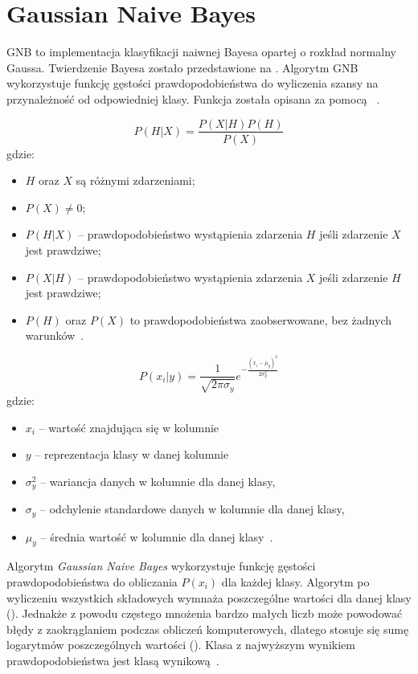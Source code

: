 \section{Gaussian Naive Bayes}
GNB to implementacja klasyfikacji naiwnej Bayesa opartej o rozkład normalny Gaussa.
Twierdzenie Bayesa zostało przedstawione na . Algorytm GNB wykorzystuje funkcję gęstości prawdopodobieństwa do wyliczenia szansy na przynależność od odpowiedniej klasy. Funkcja została opisana za pomocą ~\cite{Joyce2003}.

\begin{equation}\label{math:bayes}
P(H|X) = \frac{P(X|H) P(H)}{P(X)}
\end{equation}
gdzie:
\begin{itemize}
    \item $H$ oraz $X$ są różnymi zdarzeniami;
    \item $P(X) \neq 0$;
    \item $P(H|X)$ -- prawdopodobieństwo wystąpienia zdarzenia $H$ jeśli zdarzenie $X$ jest prawdziwe;
    \item $P(X|H)$ -- prawdopodobieństwo wystąpienia zdarzenia $X$ jeśli zdarzenie $H$ jest prawdziwe;
    \item $P(H)$ oraz $P(X)$ to prawdopodobieństwa zaobserwowane, bez żadnych warunków~\cite{Leung2007}.
\end{itemize}

\begin{equation}\label{math:gnb}
    P(x_{i}|y) = \frac{1}{\sqrt{2\pi\sigma_{y}}}e^{-\frac{(x_{i}-\mu_{y})^2}{2\sigma_{y}^{2}}}
\end{equation}
gdzie:
\begin{itemize}
        \item[] \textbf{$x_{i}$} -- wartość znajdująca się w kolumnie
        \item[] \textbf{$y$} -- reprezentacja klasy w danej kolumnie
        \item[] \textbf{$\sigma_{y}^{2}$} -- wariancja danych w kolumnie dla danej klasy,
        \item[] \textbf{$\sigma_{y}$} -- odchylenie standardowe danych w kolumnie dla danej klasy,
        \item[] \textbf{$\mu_{y}$} -- średnia wartość w kolumnie dla danej klasy~\cite{Leung2007}.
\end{itemize}

Algorytm \textit{Gaussian Naive Bayes} wykorzystuje funkcję gęstości prawdopodobieństwa do obliczania $P(x_i)$ dla każdej klasy. Algorytm po wyliczeniu wszystkich składowych wymnaża poszczególne wartości dla danej klasy (). Jednakże z powodu częstego mnożenia bardzo małych liczb może powodować błędy z zaokrąglaniem podczas obliczeń komputerowych, dlatego stosuje się sumę logarytmów poszczególnych wartości (). Klasa z najwyższym wynikiem prawdopodobieństwa jest klasą wynikową~\cite{GNBalg}.

